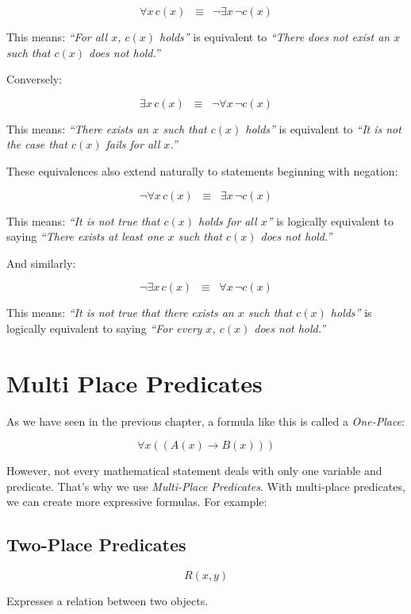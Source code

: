 \documentclass[12pt,a4paper,openany]{article}
\begin{document}
\[
\forall x \, c(x) \;\;\equiv\;\; \lnot \exists x \, \lnot c(x)
\]

This means: \emph{``For all \(x\), \(c(x)\) holds''} is equivalent to
\emph{``There does not exist an \(x\) such that \(c(x)\) does not
hold.''}

Conversely:

\[
\exists x \, c(x) \;\;\equiv\;\; \lnot \forall x \, \lnot c(x)
\]

This means: \emph{``There exists an \(x\) such that \(c(x)\) holds''} is
equivalent to \emph{``It is not the case that \(c(x)\) fails for all
\(x\).''}

These equivalences also extend naturally to statements beginning with
negation:

\[
\lnot \forall x \, c(x) \;\;\equiv\;\; \exists x \, \lnot c(x)
\]

This means: \emph{``It is not true that \(c(x)\) holds for all \(x\)''}
is logically equivalent to saying \emph{``There exists at least one
\(x\) such that \(c(x)\) does not hold.''}

And similarly:

\[
\lnot \exists x \, c(x) \;\;\equiv\;\; \forall x \, \lnot c(x)
\]

This means: \emph{``It is not true that there exists an \(x\) such that
\(c(x)\) holds''} is logically equivalent to saying \emph{``For every
\(x\), \(c(x)\) does not hold.''}



\section{Multi Place Predicates}

As we have seen in the previous chapter, a formula like this is called a
\emph{One-Place}:

\[\forall x((A(x) \rightarrow B(x)))\]

However, not every mathematical statement deals with only one variable
and predicate. That's why we use \emph{Multi-Place Predicates}. With
multi-place predicates, we can create more expressive formulas. For
example:

\subsection{Two-Place Predicates}\label{two-place-predicates}

\[R(x,y)\]

Expresses a relation between two objects.
\end{document}

